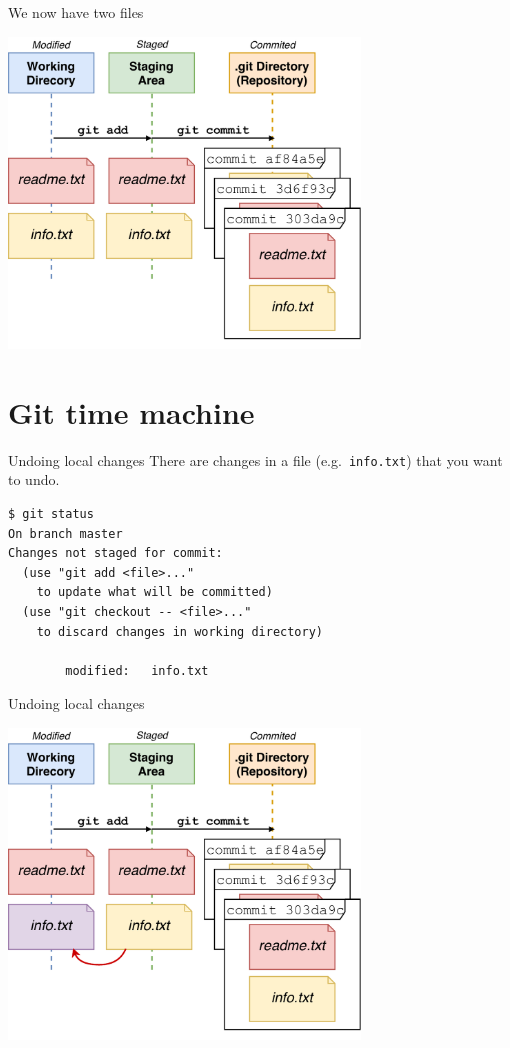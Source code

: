 \documentclass[
  11pt,
  american,
  ignorenonframetext,
  aspectratio=43,
  compress,
  xcolor=dvipsnames]{beamer}
\begin{document}
\begin{frame}{We now have two files}
\protect\hypertarget{we-now-have-two-files}{}
\begin{center}
\includegraphics[width=0.7\textwidth]{./images/git_workflow_two_files.pdf}
\end{center}
\end{frame}

\hypertarget{git-time-machine}{%
\section{Git time machine}\label{git-time-machine}}

\begin{frame}[fragile]{Undoing local changes}
\protect\hypertarget{undoing-local-changes}{}
There are changes in a file (e.g.~\texttt{info.txt}) that you want to
undo.

\begin{verbatim}
$ git status
On branch master
Changes not staged for commit:
  (use "git add <file>..." 
    to update what will be committed)
  (use "git checkout -- <file>..." 
    to discard changes in working directory)

        modified:   info.txt
\end{verbatim}
\end{frame}

\begin{frame}{Undoing local changes}
\protect\hypertarget{undoing-local-changes-1}{}
\begin{center}
\includegraphics[width=0.7\textwidth]{./images/git_workflow_replace_from_sa.pdf}
\end{center}
\end{frame}
\end{document}
